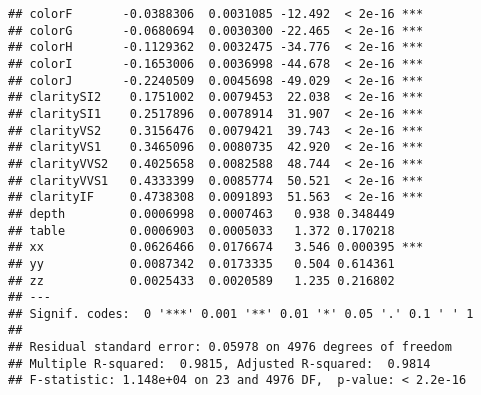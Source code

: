 \documentclass[]{article}
\begin{document}
\begin{verbatim}
## colorF       -0.0388306  0.0031085 -12.492  < 2e-16 ***
## colorG       -0.0680694  0.0030300 -22.465  < 2e-16 ***
## colorH       -0.1129362  0.0032475 -34.776  < 2e-16 ***
## colorI       -0.1653006  0.0036998 -44.678  < 2e-16 ***
## colorJ       -0.2240509  0.0045698 -49.029  < 2e-16 ***
## claritySI2    0.1751002  0.0079453  22.038  < 2e-16 ***
## claritySI1    0.2517896  0.0078914  31.907  < 2e-16 ***
## clarityVS2    0.3156476  0.0079421  39.743  < 2e-16 ***
## clarityVS1    0.3465096  0.0080735  42.920  < 2e-16 ***
## clarityVVS2   0.4025658  0.0082588  48.744  < 2e-16 ***
## clarityVVS1   0.4333399  0.0085774  50.521  < 2e-16 ***
## clarityIF     0.4738308  0.0091893  51.563  < 2e-16 ***
## depth         0.0006998  0.0007463   0.938 0.348449    
## table         0.0006903  0.0005033   1.372 0.170218    
## xx            0.0626466  0.0176674   3.546 0.000395 ***
## yy            0.0087342  0.0173335   0.504 0.614361    
## zz            0.0025433  0.0020589   1.235 0.216802    
## ---
## Signif. codes:  0 '***' 0.001 '**' 0.01 '*' 0.05 '.' 0.1 ' ' 1
## 
## Residual standard error: 0.05978 on 4976 degrees of freedom
## Multiple R-squared:  0.9815, Adjusted R-squared:  0.9814 
## F-statistic: 1.148e+04 on 23 and 4976 DF,  p-value: < 2.2e-16
\end{verbatim}
\end{document}
